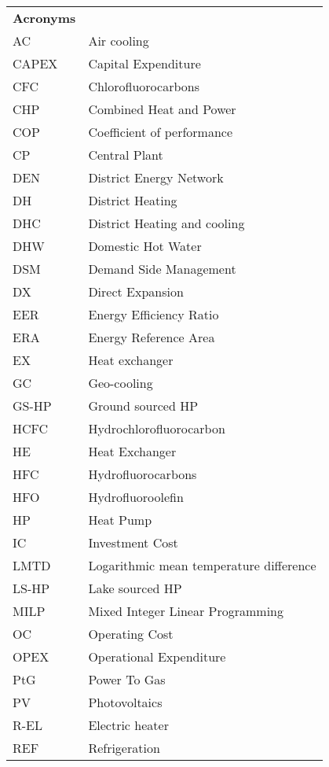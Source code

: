 \begin{table}[thp!]
	\centering
	\begin{tabular}{ll}
		\textbf{Acronyms} & \\
		AC & Air cooling \\
		CAPEX & Capital Expenditure \\
		CFC & Chlorofluorocarbons \\
		CHP & Combined Heat and Power \\
		COP & Coefficient of performance \\
		CP & Central Plant \\
		DEN & District Energy Network \\
		DH & District Heating \\
		DHC & District Heating and cooling \\
		DHW & Domestic Hot Water \\
		DSM & Demand Side Management \\
		DX & Direct Expansion \\
		EER & Energy Efficiency Ratio \\
		ERA & Energy Reference Area \\
		EX & Heat exchanger \\
		GC & Geo-cooling \\
		GS-HP & Ground sourced HP \\
		HCFC & Hydrochlorofluorocarbon \\
		HE & Heat Exchanger \\
		HFC & Hydrofluorocarbons \\
		HFO & Hydrofluoroolefin \\
		HP & Heat Pump \\
		IC & Investment Cost \\
		LMTD & Logarithmic mean temperature difference \\
		LS-HP & Lake sourced HP \\
		MILP & Mixed Integer Linear Programming \\
		OC & Operating Cost \\
		OPEX & Operational Expenditure \\
		PtG & Power To Gas \\
		PV & Photovoltaics \\
		R-EL & Electric heater \\
		REF & Refrigeration \\

\end{tabular}
\end{table}
